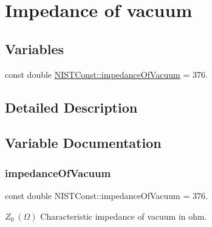 \hypertarget{group___impedance_of_vacuum}{}\section{Impedance of vacuum}
\label{group___impedance_of_vacuum}
\subsection*{Variables}
\begin{DoxyCompactItemize}
\item 
const double \hyperlink{group___impedance_of_vacuum_ga51e1aede5d89041ea7423522b526dd0e}{N\+I\+S\+T\+Const\+::impedance\+Of\+Vacuum} = 376.
\end{DoxyCompactItemize}


\subsection{Detailed Description}


\subsection{Variable Documentation}
\mbox{\label{group___impedance_of_vacuum_ga51e1aede5d89041ea7423522b526dd0e}} 
\subsubsection{\texorpdfstring{impedance\+Of\+Vacuum}{impedanceOfVacuum}}
{\footnotesize\ttfamily const double N\+I\+S\+T\+Const\+::impedance\+Of\+Vacuum = 376.}

$Z_0 \ (\Omega)$ Characteristic impedance of vacuum in ohm. 
